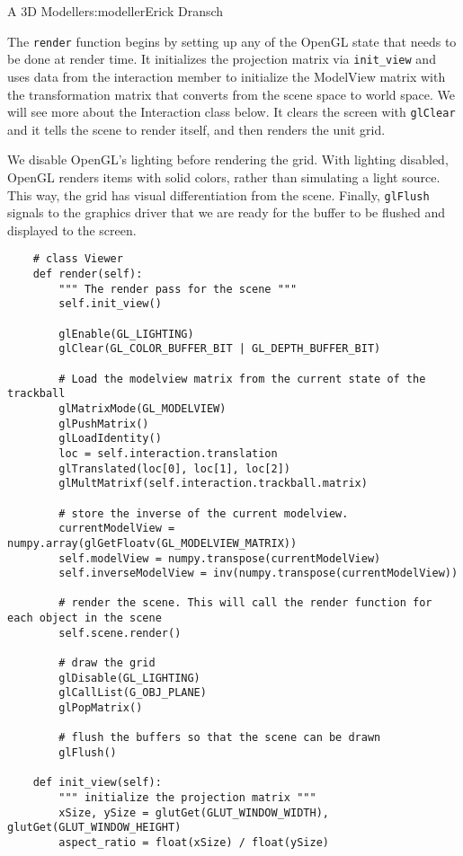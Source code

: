 \begin{aosachapter}{A 3D Modeller}{s:modeller}{Erick Dransch}
\label{rendering-with-the-viewer}

The \texttt{render} function begins by setting up any of the OpenGL
state that needs to be done at render time. It initializes the
projection matrix via \texttt{init\_view} and uses data from the
interaction member to initialize the ModelView matrix with the
transformation matrix that converts from the scene space to world space.
We will see more about the Interaction class below. It clears the screen
with \texttt{glClear} and it tells the scene to render itself, and then
renders the unit grid.

We disable OpenGL's lighting before rendering the grid. With lighting
disabled, OpenGL renders items with solid colors, rather than simulating
a light source. This way, the grid has visual differentiation from the
scene. Finally, \texttt{glFlush} signals to the graphics driver that we
are ready for the buffer to be flushed and displayed to the screen.

\begin{verbatim}
    # class Viewer
    def render(self):
        """ The render pass for the scene """
        self.init_view()

        glEnable(GL_LIGHTING)
        glClear(GL_COLOR_BUFFER_BIT | GL_DEPTH_BUFFER_BIT)

        # Load the modelview matrix from the current state of the trackball
        glMatrixMode(GL_MODELVIEW)
        glPushMatrix()
        glLoadIdentity()
        loc = self.interaction.translation
        glTranslated(loc[0], loc[1], loc[2])
        glMultMatrixf(self.interaction.trackball.matrix)

        # store the inverse of the current modelview.
        currentModelView = numpy.array(glGetFloatv(GL_MODELVIEW_MATRIX))
        self.modelView = numpy.transpose(currentModelView)
        self.inverseModelView = inv(numpy.transpose(currentModelView))

        # render the scene. This will call the render function for each object in the scene
        self.scene.render()

        # draw the grid
        glDisable(GL_LIGHTING)
        glCallList(G_OBJ_PLANE)
        glPopMatrix()

        # flush the buffers so that the scene can be drawn
        glFlush()

    def init_view(self):
        """ initialize the projection matrix """
        xSize, ySize = glutGet(GLUT_WINDOW_WIDTH), glutGet(GLUT_WINDOW_HEIGHT)
        aspect_ratio = float(xSize) / float(ySize)


\end{verbatim}
\end{aosachapter}
